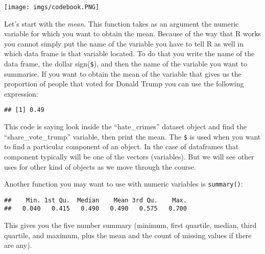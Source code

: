 \documentclass[
]{book}
\newenvironment{Shaded}{\begin{snugshade}}{\end{snugshade}}
\newcommand{\FunctionTok}[1]{\textcolor[rgb]{0.13,0.29,0.53}{\textbf{#1}}}
\newcommand{\NormalTok}[1]{#1}
\newcommand{\SpecialCharTok}[1]{\textcolor[rgb]{0.81,0.36,0.00}{\textbf{#1}}}
\begin{document}
\texttt{[image: imgs/codebook.PNG]}

Let's start with the \emph{mean}. This function takes as an argument the numeric variable for which you want to obtain the mean. Because of the way that R works you cannot simply put the name of the variable you have to tell R as well in which data frame is that variable located. To do that you write the name of the data frame, the dollar sign(\texttt{\$}), and then the name of the variable you want to summarise. If you want to obtain the mean of the variable that gives us the proportion of people that voted for Donald Trump you can use the following expression:

\begin{Shaded}
\end{Shaded}

\begin{verbatim}
## [1] 0.49
\end{verbatim}

This code is saying look inside the ``hate\_crimes'' dataset object and find the ``share\_vote\_trump'' variable, then print the mean. The \texttt{\$} is used when you want to find a particular component of an object. In the case of dataframes that component typically will be one of the vectors (variables). But we will see other uses for other kind of objects as we move through the course.

Another function you may want to use with numeric variables is \texttt{summary()}:

\begin{Shaded}
\end{Shaded}

\begin{verbatim}
##    Min. 1st Qu.  Median    Mean 3rd Qu.    Max. 
##   0.040   0.415   0.490   0.490   0.575   0.700
\end{verbatim}

This gives you the five number summary (minimum, first quartile, median, third quartile, and maximum, plus the mean and the count of missing values if there are any).
\end{document}
